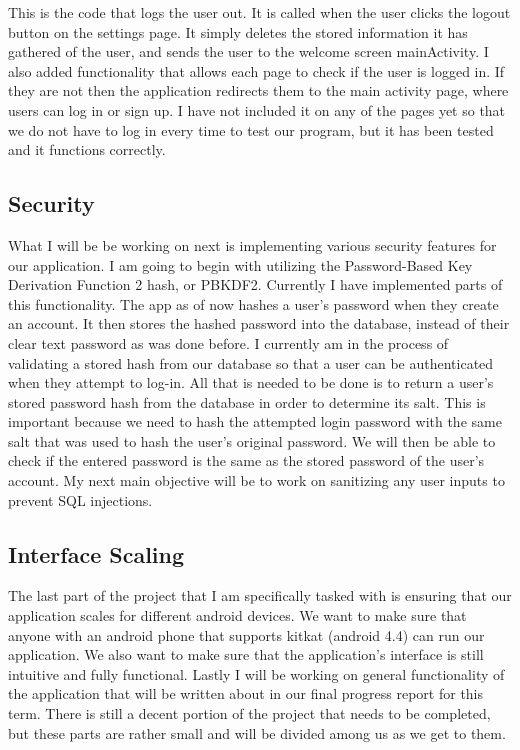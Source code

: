\documentclass[draftclsnofoot, onecolumn, 10pt, compsoc]{IEEEtran}
\begin{document}
         This is the code that logs the user out. It is called when the user clicks the logout button on the settings page. It simply deletes the stored information it has gathered of the user, and sends the user to the welcome screen mainActivity. I also added functionality that allows each page to check if the user is logged in. If they are not then the application redirects them to the main activity page, where users can log in or sign up. I have not included it on any of the pages yet so that we do not have to log in every time to test our program, but it has been tested and it functions correctly.

      \subsection{Security}
         What I will be be working on next is implementing various security features for our application. I am going to begin with utilizing the Password-Based Key Derivation Function 2 hash, or PBKDF2. Currently I have implemented parts of this functionality. The app as of now hashes a user’s password when they create an account. It then stores the hashed password into the database, instead of their clear text password as was done before. I currently am in the process of validating a stored hash from our database so that a user can be authenticated when they attempt to log-in. All that is needed to be done is to return a user’s stored password hash from the database in order to determine its salt. This is important because we need to hash the attempted login password with the same salt that was used to hash the user’s original password. We will then be able to check if the entered password is the same as the stored password of the user’s account.  My next main objective will be to work on sanitizing any user inputs to prevent SQL injections.

      \subsection{Interface Scaling}
         The last part of the project that I am specifically tasked with is ensuring that our application scales for different android devices. We want to make sure that anyone with an android phone that supports kitkat (android 4.4) can run our application. We also want to make sure that the application’s interface is still intuitive and fully functional. Lastly I will be working on general functionality of the application that will be written about in our final progress report for this term. There is still a decent portion of the project that needs to be completed, but these parts are rather small and will be divided among us as we get to them.
\end{document}
